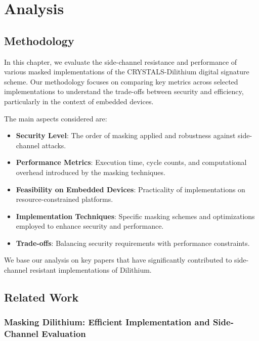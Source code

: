 
\chapter{Analysis}
\thispagestyle{chapterstart}

\section{Methodology}

In this chapter, we evaluate the side-channel resistance and performance of various masked implementations of the CRYSTALS-Dilithium digital signature scheme. Our methodology focuses on comparing key metrics across selected implementations to understand the trade-offs between security and efficiency, particularly in the context of embedded devices.

The main aspects considered are:

\begin{itemize}
    \item \textbf{Security Level}: The order of masking applied and robustness against side-channel attacks.
    \item \textbf{Performance Metrics}: Execution time, cycle counts, and computational overhead introduced by the masking techniques.
    \item \textbf{Feasibility on Embedded Devices}: Practicality of implementations on resource-constrained platforms.
    \item \textbf{Implementation Techniques}: Specific masking schemes and optimizations employed to enhance security and performance.
    \item \textbf{Trade-offs}: Balancing security requirements with performance constraints.
\end{itemize}

We base our analysis on key papers that have significantly contributed to side-channel resistant implementations of Dilithium.

\section{Related Work}

\subsection{Masking Dilithium: Efficient Implementation and Side-Channel Evaluation}

